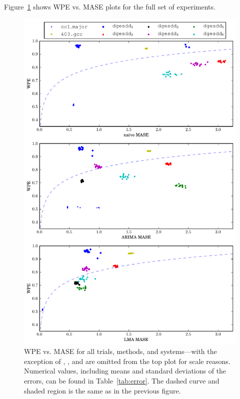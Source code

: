 Figure~\ref{fig:wpe_vs_mase_all} shows WPE vs. MASE plots for the full
set of experiments.
\begin{figure}
  \centering
  \includegraphics[width=\columnwidth]{figs/new_predictions_vs_entropy3}
\caption{WPE vs. MASE for all trials, methods, and systems---with the
  exception of \svdone, \svdthree, and \svdfive are omitted from the
  top plot for scale reasons.
%
%
Numerical values, including means and standard deviations of the
errors, can be found in Table~\ref{tab:error}.  The dashed curve and
shaded region is the same as in the previous figure.  }
    \label{fig:wpe_vs_mase_all}
\end{figure}
